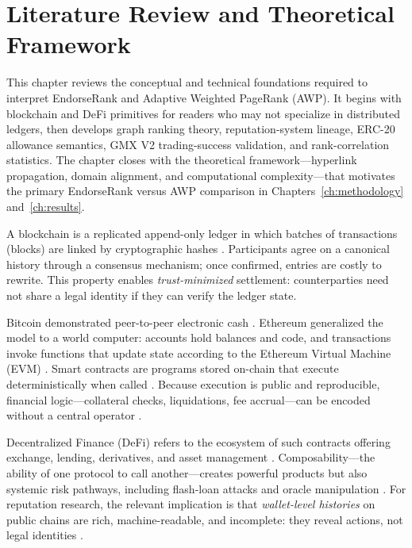 \chapter{Literature Review and Theoretical Framework}
\label{ch:literature}

This chapter reviews the conceptual and technical foundations required to interpret EndorseRank and Adaptive Weighted PageRank (AWP). It begins with blockchain and DeFi primitives for readers who may not specialize in distributed ledgers, then develops graph ranking theory, reputation-system lineage, ERC-20 allowance semantics, GMX V2 trading-success validation, and rank-correlation statistics. The chapter closes with the theoretical framework---hyperlink propagation, domain alignment, and computational complexity---that motivates the primary EndorseRank versus AWP comparison in Chapters~\ref{ch:methodology} and~\ref{ch:results}.


A blockchain is a replicated append-only ledger in which batches of transactions (blocks) are linked by cryptographic hashes . Participants agree on a canonical history through a consensus mechanism; once confirmed, entries are costly to rewrite. This property enables \emph{trust-minimized} settlement: counterparties need not share a legal identity if they can verify the ledger state.

Bitcoin demonstrated peer-to-peer electronic cash . Ethereum generalized the model to a world computer: accounts hold balances and code, and transactions invoke functions that update state according to the Ethereum Virtual Machine (EVM) . Smart contracts are programs stored on-chain that execute deterministically when called . Because execution is public and reproducible, financial logic---collateral checks, liquidations, fee accrual---can be encoded without a central operator .

Decentralized Finance (DeFi) refers to the ecosystem of such contracts offering exchange, lending, derivatives, and asset management . Composability---the ability of one protocol to call another---creates powerful products but also systemic risk pathways, including flash-loan attacks and oracle manipulation . For reputation research, the relevant implication is that \emph{wallet-level histories} on public chains are rich, machine-readable, and incomplete: they reveal actions, not legal identities .

